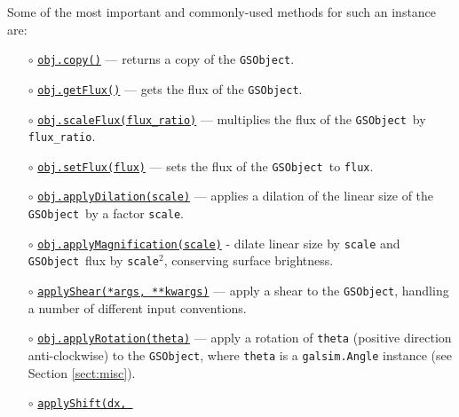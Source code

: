 \documentclass[preprint,11pt]{aastex}
\newcommand{\gsobject}{{\tt GSObject}}
\begin{document}
Some of the most important and commonly-used methods for such an
instance are:
\begin{itemize}
\item[$\circ$]
  \href{http://galsim-developers.github.com/GalSim/classgalsim_1_1base_1_1_g_s_object.html#aa0b398d4b0fca70211e4a73f81ea7e1a}{\texttt{obj.copy()}}
  --- returns a copy of the \gsobject.
\item[$\circ$]
  \href{http://galsim-developers.github.com/GalSim/classgalsim_1_1base_1_1_g_s_object.html#a662d8ce421ecd90080bdcaaf6890aed8}{\texttt{obj.getFlux()}}
  --- gets the flux of the \gsobject.
\item[$\circ$]\href{http://galsim-developers.github.com/GalSim/classgalsim_1_1base_1_1_g_s_object.html#af4193645a9af52e7d54a044cafec8ab9}{\texttt{obj.scaleFlux(flux\_ratio)}}
  --- multiplies the flux of the \gsobject~by \texttt{flux\_ratio}.
\item[$\circ$]
  \href{http://galsim-developers.github.com/GalSim/classgalsim_1_1base_1_1_g_s_object.html#a1993652591ddc802b734186391b28894}{\texttt{obj.setFlux(flux)}}
    --- sets the flux of the \gsobject~to \texttt{flux}.
\item[$\circ$]
  \href{http://galsim-developers.github.com/GalSim/classgalsim_1_1base_1_1_g_s_object.html#a4301c73bbc1491ebb170e64c509cadd5}{\texttt{obj.applyDilation(scale)}}
  --- applies a dilation of the linear size of the \gsobject~by a
  factor \texttt{scale}.
\item[$\circ$]
  \href{http://galsim-developers.github.com/GalSim/classgalsim_1_1base_1_1_g_s_object.html#a9d13b0238057f6d5d01f2681d91c09b0}{\texttt{obj.applyMagnification(scale)}}
  - dilate linear size by \texttt{scale} and \gsobject~flux by
  \texttt{scale}$^2$, conserving surface brightness.
\item[$\circ$]
  \href{http://galsim-developers.github.com/GalSim/classgalsim_1_1base_1_1_g_s_object.html#a85cc0094dcf470cfbff93d9830ab80bd}{\texttt{applyShear(*args,
      **kwargs)}}
  --- apply a shear to the \gsobject, handling a number of different
  input conventions.
\item[$\circ$]
  \href{http://galsim-developers.github.com/GalSim/classgalsim_1_1base_1_1_g_s_object.html#ad6236e3153f23f1201396369dd67f1c7}{\texttt{obj.applyRotation(theta)}}
  --- apply a rotation of \texttt{theta} (positive direction
  anti-clockwise) to the \gsobject, where \texttt{theta} is a
  \texttt{galsim.Angle} instance (see Section \ref{sect:misc}). 
\item[$\circ$]
  \href{http://galsim-developers.github.com/GalSim/classgalsim_1_1base_1_1_g_s_object.html#a6b547741eeec4086de9abe227dae9325}{\texttt{applyShift(dx,
}}
\end{itemize}
\end{document}
